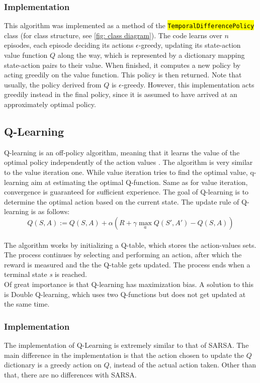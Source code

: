 \documentclass{class}
\def\code#1{\hl{\texttt{#1}}}
\begin{document}
\subsubsection*{Implementation}
This algorithm was implemented as a method of the \code{TemporalDifferencePolicy} class (for class structure, see \autoref{fig: class diagram}). The code learns over $n$ episodes, each episode deciding its actions $\epsilon$-greedy, updating its state-action value function $Q$ along the way, which is represented by a dictionary mapping state-action pairs to their value. When finished, it computes a new policy by acting greedily on the value function. This policy is then returned. Note that usually, the policy derived from $Q$ is $\epsilon$-greedy. However, this implementation acts greedily instead in the final policy, since it is assumed to have arrived at an approximately optimal policy. 

\subsection{Q-Learning}
\label{subsec: q-learning}
Q-learning is an off-policy algorithm, meaning that it learns the value of the optimal policy independently of the action values \parencite{off-policy-q-learning}. The algorithm is very similar to the value iteration one. While value iteration tries to find the optimal value, q-learning aim at estimating the optimal Q-function. Same as for value iteration, convergence is guaranteed for sufficient experience. The goal of Q-learning is to determine the optimal action based on the current state. The update rule of Q-learning is as follows:
\begin{equation}
    \label{eq: sarsa}
    Q(S,A) := Q(S,A) + \alpha(R + \gamma \max_a Q(S', A') - Q(S, A))
\end{equation}
\\[0.3cm]
The algorithm works by initializing a Q-table, which stores the action-values sets. The process continues by selecting and performing an action, after which the reward is measured and the the Q-table gets updated. The process ends when a terminal state \textit{s} is reached.
\\[0.3cm]
Of great importance is that Q-learning has maximization bias. A solution to this is Double Q-learning, which uses two Q-functions but does not get updated at the same time.

\subsubsection*{Implementation}
The implementation of Q-Learning is extremely similar to that of SARSA. The main difference in the implementation is that the action chosen to update the $Q$ dictionary is a greedy action on $Q$, instead of the actual action taken. Other than that, there are no differences with SARSA.
\end{document}
